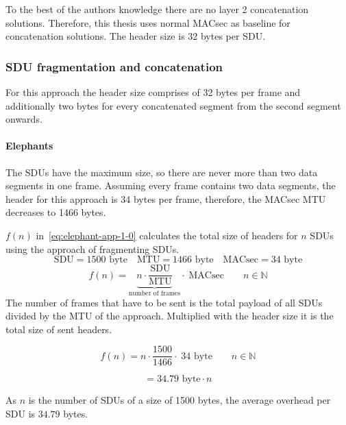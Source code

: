 To the best of the authors knowledge there are no layer 2 concatenation solutions.
Therefore, this thesis uses normal \gls{MACsec} as baseline for concatenation solutions.
The header size is 32 bytes per \gls{SDU}.

\subsubsection{\gls{SDU} fragmentation and concatenation}
For this approach the header size comprises of 32 bytes per frame and additionally two bytes for every concatenated segment from the second segment onwards.

\paragraph{Elephants}
The \glspl{SDU} have the maximum size, so there are never more than two data segments in one frame.
Assuming every frame contains two data segments, the header for this approach is 34 bytes per frame, therefore, the \gls{MACsec} \gls{MTU} decreases to 1466 bytes.

$f(n)$ in~\ref{eq:elephant-app-1-0} calculates the total size of headers for $n$ \glspl{SDU} using the approach of fragmenting \glspl{SDU}.
\begin{equation*}
  \text{SDU} = 1500\text{ byte}
  \quad   \text{MTU} = 1466\text{ byte}
  \quad   \text{MACsec} = 34\text{ byte}
\end{equation*}
\begin{equation}\label{eq:elephant-app-1-0}
  f(n) = \underbrace{n \cdot \frac{\text{SDU}}{\text{MTU}}}_{\text{number of frames}} \cdot\; \text{MACsec} \qquad n \in \mathbb{N}
\end{equation}
The number of frames that have to be sent is the total payload of all \glspl{SDU} divided by the \gls{MTU} of the approach.
Multiplied with the header size it is the total size of sent headers.

\begin{equation}\label{eq:elephant-app-1-1}
  f(n) = n \cdot \frac{1500}{1466} \cdot\; 34 \text{ byte} \qquad n \in \mathbb{N}
\end{equation}

\begin{equation}
  = 34.79\text{ byte} \cdot n
\end{equation}

As $n$ is the number of \glspl{SDU} of a size of 1500 bytes, the average overhead per \gls{SDU} is $34.79$ bytes.

